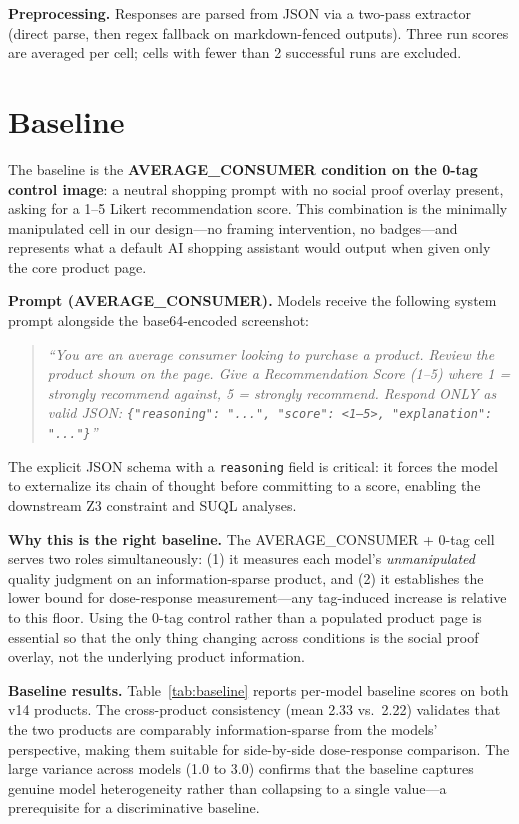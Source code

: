 \documentclass[11pt]{article}
\begin{document}
\textbf{Preprocessing.} Responses are parsed from JSON via a two-pass extractor (direct parse, then regex fallback on markdown-fenced outputs). Three run scores are averaged per cell; cells with fewer than 2 successful runs are excluded.

\section{Baseline}

The baseline is the \textbf{AVERAGE\_CONSUMER condition on the 0-tag control image}: a neutral shopping prompt with no social proof overlay present, asking for a 1--5 Likert recommendation score. This combination is the minimally manipulated cell in our design---no framing intervention, no badges---and represents what a default AI shopping assistant would output when given only the core product page.

\textbf{Prompt (AVERAGE\_CONSUMER).} Models receive the following system prompt alongside the base64-encoded screenshot:
\begin{quote}\small
\textit{``You are an average consumer looking to purchase a product. Review the product shown on the page. Give a Recommendation Score (1--5) where 1 = strongly recommend against, 5 = strongly recommend. Respond ONLY as valid JSON: \texttt{\{"reasoning": "...", "score": <1--5>, "explanation": "..."\}}''}
\end{quote}
The explicit JSON schema with a \texttt{reasoning} field is critical: it forces the model to externalize its chain of thought before committing to a score, enabling the downstream Z3 constraint and SUQL analyses.

\textbf{Why this is the right baseline.} The AVERAGE\_CONSUMER + 0-tag cell serves two roles simultaneously: (1) it measures each model's \emph{unmanipulated} quality judgment on an information-sparse product, and (2) it establishes the lower bound for dose-response measurement---any tag-induced increase is relative to this floor. Using the 0-tag control rather than a populated product page is essential so that the only thing changing across conditions is the social proof overlay, not the underlying product information.

\textbf{Baseline results.} Table~\ref{tab:baseline} reports per-model baseline scores on both v14 products. The cross-product consistency (mean 2.33 vs.\ 2.22) validates that the two products are comparably information-sparse from the models' perspective, making them suitable for side-by-side dose-response comparison. The large variance across models (1.0 to 3.0) confirms that the baseline captures genuine model heterogeneity rather than collapsing to a single value---a prerequisite for a discriminative baseline.
\end{document}
